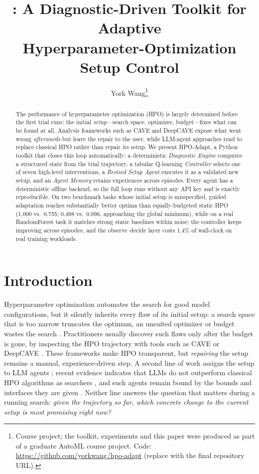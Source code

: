 \documentclass[10pt]{article}
\title{\toolname{}: A Diagnostic-Driven Toolkit for Adaptive\\ Hyperparameter-Optimization Setup Control}
\author{York Wang\thanks{Course project; the toolkit, experiments and this paper were produced as
part of a graduate AutoML course project. Code: \url{https://github.com/yorkwang/hpo-adapt}
(replace with the final repository URL).}}
\date{}
\newcommand{\toolname}{HPO-Adapt}
\begin{document}
\maketitle

\begin{abstract}
The performance of hyperparameter optimization (HPO) is largely determined
before the first trial runs: the initial \emph{setup}---search space,
optimizer, budget---fixes what can be found at all. Analysis frameworks
such as CAVE and DeepCAVE expose what went wrong \emph{afterwards} but
leave the repair to the user, while LLM-agent approaches tend to replace
classical HPO rather than repair its setup. We present \toolname{}, a
Python toolkit that closes this loop automatically: a deterministic
\emph{Diagnostic Engine} computes a structured state from the trial
trajectory, a tabular Q-learning \emph{Controller} selects one of seven
high-level interventions, a \emph{Revised Setup Agent} executes it as a
validated new setup, and an \emph{Agent Memory} retains experiences across
episodes. Every agent has a deterministic offline backend, so the full
loop runs without any API key and is exactly reproducible. On two
benchmark tasks whose initial setup is misspecified, guided adaptation
reaches substantially better optima than equally-budgeted static HPO
(1.000 vs.\ 0.755; 0.498 vs.\ 0.896, approaching the global minimum),
while on a real RandomForest task it matches strong static baselines
within noise; the controller keeps improving across episodes, and the
observe--decide layer costs 1.4\% of wall-clock on real training
workloads.
\end{abstract}

\section{Introduction}
\label{sec:intro}

Hyperparameter optimization automates the search for good model
configurations, but it silently inherits every flaw of its initial setup:
a search space that is too narrow truncates the optimum, an unsuited
optimizer or budget wastes the search \cite{feurer2019hyperparameter}.
Practitioners usually discover such flaws only after the budget is gone,
by inspecting the HPO trajectory with tools such as CAVE
\cite{eggensperger2019cave} or DeepCAVE \cite{segel2025deepcave}. These
frameworks make HPO transparent, but \emph{repairing} the setup remains a
manual, experience-driven step. A second line of work assigns the setup
to LLM agents \cite{liu2025agenthpo,trirat2025automlagent}; recent
evidence indicates that LLMs do not outperform classical HPO algorithms
as searchers \cite{ferreira2026llms}, and such agents remain bound by the
bounds and interfaces they are given \cite{tornede2024automl}. Neither
line answers the question that matters during a running search:
\emph{given the trajectory so far, which concrete change to the current
setup is most promising right now?}
\end{document}
